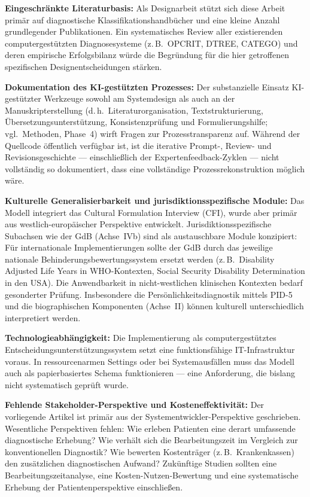 \documentclass[11pt,a4paper]{article}
\begin{document}
\textbf{Eingeschr\"ankte Literaturbasis:} Als Designarbeit st\"utzt sich diese Arbeit prim\"ar auf diagnostische Klassifikationshandb\"ucher und eine kleine Anzahl grundlegender Publikationen. Ein systematisches Review aller existierenden computergest\"utzten Diagnosesysteme (z.\,B.\ OPCRIT, DTREE, CATEGO) und deren empirische Erfolgsbilanz w\"urde die Begr\"undung f\"ur die hier getroffenen spezifischen Designentscheidungen st\"arken.

\textbf{Dokumentation des KI-gest\"utzten Prozesses:} Der substanzielle Einsatz KI-gest\"utzter Werkzeuge sowohl am Systemdesign als auch an der Manuskripterstellung (d.\,h.\ Literaturorganisation, Textstrukturierung, \"Ubersetzungsunterst\"utzung, Konsistenzpr\"ufung und Formulierungshilfe; vgl.\ Methoden, Phase~4) wirft Fragen zur Prozesstransparenz auf. W\"ahrend der Quellcode \"offentlich verf\"ugbar ist, ist die iterative Prompt-, Review- und Revisionsgeschichte --- einschlie\ss{}lich der Expertenfeedback-Zyklen --- nicht vollst\"andig so dokumentiert, dass eine vollst\"andige Prozessrekonstruktion m\"oglich w\"are.

\textbf{Kulturelle Generalisierbarkeit und jurisdiktionsspezifische Module:} Das Modell integriert das Cultural Formulation Interview (CFI), wurde aber prim\"ar aus westlich-europ\"aischer Perspektive entwickelt. Jurisdiktionsspezifische Subachsen wie der GdB (Achse~IVb) sind als austauschbare Module konzipiert: F\"ur internationale Implementierungen sollte der GdB durch das jeweilige nationale Behinderungsbewertungssystem ersetzt werden (z.\,B.\ Disability Adjusted Life Years in WHO-Kontexten, Social Security Disability Determination in den USA). Die Anwendbarkeit in nicht-westlichen klinischen Kontexten bedarf gesonderter Pr\"ufung. Insbesondere die Pers\"onlichkeitsdiagnostik mittels PID-5 und die biographischen Komponenten (Achse~II) k\"onnen kulturell unterschiedlich interpretiert werden.

\textbf{Technologieabh\"angigkeit:} Die Implementierung als computergest\"utztes Entscheidungsunterst\"utzungssystem setzt eine funktionsf\"ahige IT-Infrastruktur voraus. In ressourcenarmen Settings oder bei Systemausf\"allen muss das Modell auch als papierbasiertes Schema funktionieren --- eine Anforderung, die bislang nicht systematisch gepr\"uft wurde.

\textbf{Fehlende Stakeholder-Perspektive und Kosteneffektivit\"at:} Der vorliegende Artikel ist prim\"ar aus der Systementwickler-Perspektive geschrieben. Wesentliche Perspektiven fehlen: Wie erleben Patienten eine derart umfassende diagnostische Erhebung? Wie verh\"alt sich die Bearbeitungszeit im Vergleich zur konventionellen Diagnostik? Wie bewerten Kostentr\"ager (z.\,B.\ Krankenkassen) den zus\"atzlichen diagnostischen Aufwand? Zuk\"unftige Studien sollten eine Bearbeitungszeitanalyse, eine Kosten-Nutzen-Bewertung und eine systematische Erhebung der Patientenperspektive einschlie\ss{}en.
\end{document}
